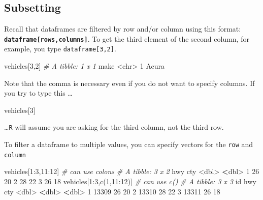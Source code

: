 \documentclass[
]{book}
\newenvironment{Shaded}{\begin{snugshade}}{\end{snugshade}}
\newcommand{\CommentTok}[1]{\textcolor[rgb]{0.56,0.35,0.01}{\textit{#1}}}
\newcommand{\DecValTok}[1]{\textcolor[rgb]{0.00,0.00,0.81}{#1}}
\newcommand{\ErrorTok}[1]{\textcolor[rgb]{0.64,0.00,0.00}{\textbf{#1}}}
\newcommand{\FunctionTok}[1]{\textcolor[rgb]{0.00,0.00,0.00}{#1}}
\newcommand{\NormalTok}[1]{#1}
\newcommand{\SpecialCharTok}[1]{\textcolor[rgb]{0.00,0.00,0.00}{#1}}
\begin{document}
\hypertarget{subsetting-1}{%
\subsection*{Subsetting}\label{subsetting-1}}

Recall that dataframes are filtered by row and/or column using this format: \textbf{\texttt{dataframe{[}rows,columns{]}}}. To get the third element of the second column, for example, you type \texttt{dataframe{[}3,2{]}}.

\begin{Shaded}
\begin{Highlighting}[]
\NormalTok{vehicles[}\DecValTok{3}\NormalTok{,}\DecValTok{2}\NormalTok{]}
\CommentTok{\# A tibble: 1 x 1}
\NormalTok{  make }
  \SpecialCharTok{\textless{}}\NormalTok{chr}\SpecialCharTok{\textgreater{}}
\DecValTok{1}\NormalTok{ Acura}
\end{Highlighting}
\end{Shaded}

Note that the comma is necessary even if you do not want to specify columns. If you try to type this \ldots{}

\begin{Shaded}
\begin{Highlighting}[]
\NormalTok{vehicles[}\DecValTok{3}\NormalTok{]}
\end{Highlighting}
\end{Shaded}

\ldots{}\texttt{R} will assume you are asking for the third column, not the third row.

To filter a dataframe to multiple values, you can specify vectors for the \texttt{row} and \texttt{column}

\begin{Shaded}
\begin{Highlighting}[]
\NormalTok{vehicles[}\DecValTok{1}\SpecialCharTok{:}\DecValTok{3}\NormalTok{,}\DecValTok{11}\SpecialCharTok{:}\DecValTok{12}\NormalTok{] }\CommentTok{\# can use colons}
\CommentTok{\# A tibble: 3 x 2}
\NormalTok{    hwy   cty}
  \SpecialCharTok{\textless{}}\NormalTok{dbl}\SpecialCharTok{\textgreater{}} \ErrorTok{\textless{}}\NormalTok{dbl}\SpecialCharTok{\textgreater{}}
\DecValTok{1}    \DecValTok{26}    \DecValTok{20}
\DecValTok{2}    \DecValTok{28}    \DecValTok{22}
\DecValTok{3}    \DecValTok{26}    \DecValTok{18}
\NormalTok{vehicles[}\DecValTok{1}\SpecialCharTok{:}\DecValTok{3}\NormalTok{,}\FunctionTok{c}\NormalTok{(}\DecValTok{1}\NormalTok{,}\DecValTok{11}\SpecialCharTok{:}\DecValTok{12}\NormalTok{)]  }\CommentTok{\# can use c()}
\CommentTok{\# A tibble: 3 x 3}
\NormalTok{     id   hwy   cty}
  \SpecialCharTok{\textless{}}\NormalTok{dbl}\SpecialCharTok{\textgreater{}} \ErrorTok{\textless{}}\NormalTok{dbl}\SpecialCharTok{\textgreater{}} \ErrorTok{\textless{}}\NormalTok{dbl}\SpecialCharTok{\textgreater{}}
\DecValTok{1} \DecValTok{13309}    \DecValTok{26}    \DecValTok{20}
\DecValTok{2} \DecValTok{13310}    \DecValTok{28}    \DecValTok{22}
\DecValTok{3} \DecValTok{13311}    \DecValTok{26}    \DecValTok{18}
\end{Highlighting}
\end{Shaded}
\end{document}
